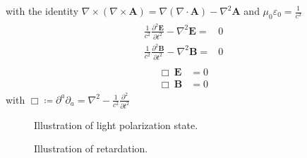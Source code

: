 % 
with the identity $\nabla \times \left( \nabla \times \mathbf{A} \right) = \nabla(\nabla \cdot \mathbf{A}) - \nabla^{2}\mathbf{A}$ and $\mu_0\varepsilon_0 = \frac{1}{c^2}$
% 
\begin{align}
\begin{split} \label{eq::maxwell_wave_equations}
  \frac{1}{c^2} \frac{\partial^2 \mathbf{E}}{\partial t^2} - \nabla^2 \mathbf{E} =& 0 \\
  \frac{1}{c^2} \frac{\partial^2 \mathbf{B}}{\partial t^2} - \nabla^2 \mathbf{B} =& 0
\end{split}
\end{align}
% 
\begin{align}
\begin{split} \label{eq::maxwell_wave_equations_box}
  \Box \ \mathbf{E} &= 0 \\
  \Box \ \mathbf{B} &= 0
\end{split}
\end{align}
% 
with $\Box \coloneqq \partial^a\partial_a = \nabla^2 - \frac{1}{c^2} \frac{\partial^2}{\partial t^2}$
%
\begin{figure}[!t]
\centering
\def\tikzwidth{\textwidth}
\label{fig:polarization_state}
\caption{Illustration of light polarization state.}
\end{figure}
%
\begin{figure}[!t]
\centering
\def\tikzwidth{\textwidth}
\label{fig:optic_retardation}
\caption{Illustration of retardation.}
\end{figure}
% 
